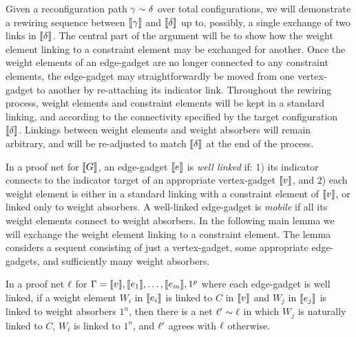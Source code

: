 \documentclass{sigplanconf-modified}
\let\aftersubsection=\noindent
\begin{document}
\aftersubsection
Given a reconfiguration path $\gamma\perm\delta$ over total configurations, we will demonstrate a rewiring sequence between $\llbracket\gamma\rrbracket$ and $\llbracket\delta\rrbracket$ up to, possibly, a single exchange of two links in $\llbracket\delta\rrbracket$.
%
The central part of the argument will be to show how the weight element linking to a constraint element may be exchanged for another.
%
Once the weight elements of an edge-gadget are no longer connected to any constraint elements, the edge-gadget may straightforwardly be moved from one vertex-gadget to another by re-attaching its indicator link.
%
Throughout the rewiring process, weight elements and constraint elements will be kept in a standard linking, and according to the connectivity specified by the target configuration $\llbracket\delta\rrbracket$.
%
Linkings between weight elements and weight absorbers will remain arbitrary, and will be re-adjusted to match $\llbracket\delta\rrbracket$ at the end of the process.



In a proof net for $\llbracket G\rrbracket$, an edge-gadget $\llbracket e\rrbracket$ is \emph{well linked} if: 1) its indicator connects to the indicator target of an appropriate vertex-gadget $\llbracket v\rrbracket$, and 2) each weight element is either in a standard linking with a constraint element of $\llbracket v\rrbracket$, or linked only to weight absorbers.
%
A well-linked edge-gadget is \emph{mobile} if all its weight elements connect to weight absorbers.
%
In the following main lemma we will exchange the weight element linking to a constraint element.
%
The lemma considers a sequent consisting of just a vertex-gadget, some appropriate edge-gadgets, and sufficiently many weight absorbers.


\begin{lemma}
\label{lem:octopus roll}
In a proof net $\ell$ for $\Gamma=\llbracket v\rrbracket,\llbracket e_1\rrbracket,\dotsc,\llbracket e_m\rrbracket,1^p$ where each edge-gadget is well linked, if a weight element $W_i$ in $\llbracket e_i\rrbracket$ is linked to $C$ in $\llbracket v\rrbracket$ and $W_j$ in $\llbracket e_j\rrbracket$ is linked to weight absorbers $1^n$, then there is a net $\links'\perm\links$ in which $W_j$ is naturally linked to $C$, $W_i$ is linked to $1^n$, and $\ell'$ agrees with $\ell$ otherwise.
\end{lemma}


\renewcommand\scalefactor{0.88}

\newcommand\displayOcto[1]{%
 \NoIndent{%
   \smallskip%
   \centerline{%
	 \scale{#1}%
  }}%
  \bigskip%
}
\end{document}
